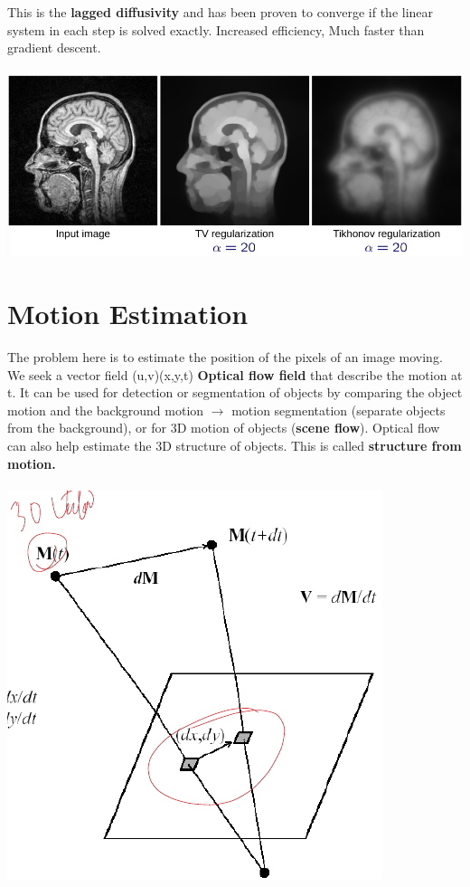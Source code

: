 \documentclass{article}
\begin{document}
This is the \textbf{lagged diffusivity} and has been proven to converge if the linear system in each step is solved exactly. Increased efficiency, Much faster than gradient descent.\\\\
\includegraphics[scale=0.3]{53.png}
\newpage
\section{Motion Estimation}
The problem here is to estimate the position of the pixels of an image moving. We seek a vector field (u,v)(x,y,t) \textbf{Optical flow field} that describe the motion at t. It can be used for detection or segmentation of objects by comparing the object motion and the background motion $\rightarrow$ motion segmentation (separate objects from the background), or for 3D motion of objects (\textbf{scene flow}). Optical flow can also help estimate the 3D structure of objects. This is called \textbf{structure from motion.}\\\\
\includegraphics[scale=0.3]{54.png}\\\\
\end{document}

